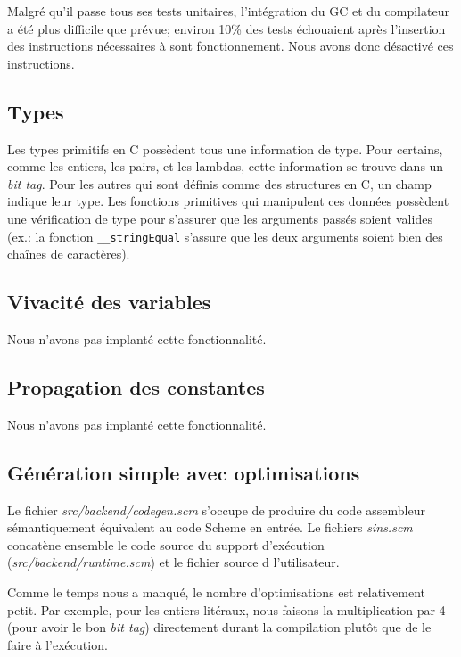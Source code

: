 \documentclass[11pt]{report}
\begin{document}
Malgré qu'il passe tous ses tests unitaires, l'intégration du GC et du
compilateur a été plus difficile que prévue; environ 10\% des tests
échouaient après l'insertion des instructions nécessaires à sont
fonctionnement.  Nous avons donc désactivé ces instructions.

\subsection{Types}

Les types primitifs en C possèdent tous une information de type.  Pour
certains, comme les entiers, les pairs, et les lambdas, cette
information se trouve dans un {\it bit tag}.  Pour les autres qui sont
définis comme des structures en C, un champ indique leur type.  Les
fonctions primitives qui manipulent ces données possèdent une
vérification de type pour s'assurer que les arguments passés soient
valides (ex.: la fonction {\tt __stringEqual} s'assure que les deux
arguments soient bien des chaînes de caractères).

\subsection{Vivacité des variables}

Nous n'avons pas implanté cette fonctionnalité.

\subsection{Propagation des constantes}

Nous n'avons pas implanté cette fonctionnalité.

\subsection{Génération simple avec optimisations}

Le fichier {\it src/backend/codegen.scm} s'occupe de produire du code
assembleur sémantiquement équivalent au code Scheme en entrée. Le
fichiers {\it sins.scm} concatène ensemble le code source du support
d'exécution ({\it src/backend/runtime.scm}) et le fichier source d
l'utilisateur.

Comme le temps nous a manqué, le nombre d'optimisations est
relativement petit. Par exemple, pour les entiers litéraux, nous
faisons la multiplication par 4 (pour avoir le bon {\it bit tag})
directement durant la compilation plutôt que de le faire à
l'exécution.
\end{document}
